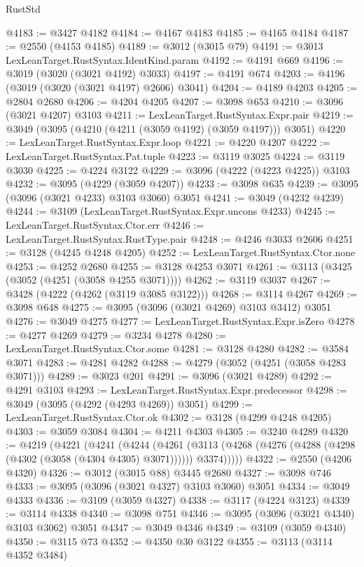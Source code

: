 \begin{lexlean}{RustStd}
\begin{coremodule}
{\begin{coremodule}
{{{{{{{{{{{{{{{{{{{{{{{{{{{{{{{{@4183 := @3427 @4182
@4184 := @4167 @4183
@4185 := @4165 @4184
@4187 := @2550 (@4153 @4185)
@4189 := @3012 (@3015 @79)
@4191 := @3013 LexLeanTarget.RustSyntax.IdentKind.param
@4192 := @4191 @669
@4196 := @3019 (@3020 (@3021 @4192) @3033)
@4197 := @4191 @674
@4203 := @4196 (@3019 (@3020 (@3021 @4197) @2606) @3041)
@4204 := @4189 @4203
@4205 := @2804 @2680
@4206 := @4204 @4205
@4207 := @3098 @653
@4210 := @3096 (@3021 @4207) @3103
@4211 := LexLeanTarget.RustSyntax.Expr.pair
@4219 := @3049 (@3095 (@4210 (@4211 (@3059 @4192) (@3059 @4197))) @3051)
@4220 := LexLeanTarget.RustSyntax.Expr.loop
@4221 := @4220 @4207
@4222 := LexLeanTarget.RustSyntax.Pat.tuple
@4223 := @3119 @3025
@4224 := @3119 @3030
@4225 := @4224 @3122
@4229 := @3096 (@4222 (@4223 @4225)) @3103
@4232 := @3095 (@4229 (@3059 @4207))
@4233 := @3098 @635
@4239 := @3095 (@3096 (@3021 @4233) @3103 @3060) @3051
@4241 := @3049 (@4232 @4239)
@4244 := @3109 (LexLeanTarget.RustSyntax.Expr.uncons @4233)
@4245 := LexLeanTarget.RustSyntax.Ctor.err
@4246 := LexLeanTarget.RustSyntax.RustType.pair
@4248 := @4246 @3033 @2606
@4251 := @3128 (@4245 @4248 @4205)
@4252 := LexLeanTarget.RustSyntax.Ctor.none
@4253 := @4252 @2680
@4255 := @3128 @4253 @3071
@4261 := @3113 (@3425 (@3052 (@4251 (@3058 @4255 @3071))))
@4262 := @3119 @3037
@4267 := @3428 (@4222 (@4262 (@3119 @3085 @3122)))
@4268 := @3114 @4267
@4269 := @3098 @648
@4275 := @3095 (@3096 (@3021 @4269) @3103 @3412) @3051
@4276 := @3049 @4275
@4277 := LexLeanTarget.RustSyntax.Expr.isZero
@4278 := @4277 @4269
@4279 := @3234 @4278
@4280 := LexLeanTarget.RustSyntax.Ctor.some
@4281 := @3128 @4280
@4282 := @3584 @3071
@4283 := @4281 @4282
@4288 := @4279 (@3052 (@4251 (@3058 @4283 @3071)))
@4289 := @3023 @201
@4291 := @3096 (@3021 @4289)
@4292 := @4291 @3103
@4293 := LexLeanTarget.RustSyntax.Expr.predecessor
@4298 := @3049 (@3095 (@4292 (@4293 @4269)) @3051)
@4299 := LexLeanTarget.RustSyntax.Ctor.ok
@4302 := @3128 (@4299 @4248 @4205)
@4303 := @3059 @3084
@4304 := @4211 @4303
@4305 := @3240 @4289
@4320 := @4219
    (@4221
      (@4241
        (@4244
          (@4261
            (@3113 (@4268 (@4276 (@4288 (@4298 (@4302 (@3058 (@4304 @4305) @3071)))))) @3374)))))
@4322 := @2550 (@4206 @4320)
@4326 := @3012 (@3015 @88) @3445 @2680
@4327 := @3098 @746
@4333 := @3095 (@3096 (@3021 @4327) @3103 @3060) @3051
@4334 := @3049 @4333
@4336 := @3109 (@3059 @4327)
@4338 := @3117 (@4224 @3123)
@4339 := @3114 @4338
@4340 := @3098 @751
@4346 := @3095 (@3096 (@3021 @4340) @3103 @3062) @3051
@4347 := @3049 @4346
@4349 := @3109 (@3059 @4340)
@4350 := @3115 @73
@4352 := @4350 @30 @3122
@4355 := @3113 (@3114 @4352 @3484)
}}}}}}}}}}}}}}}}}}}}}}}}}}}}}}}}
\end{coremodule}}
\end{coremodule}
\end{lexlean}
